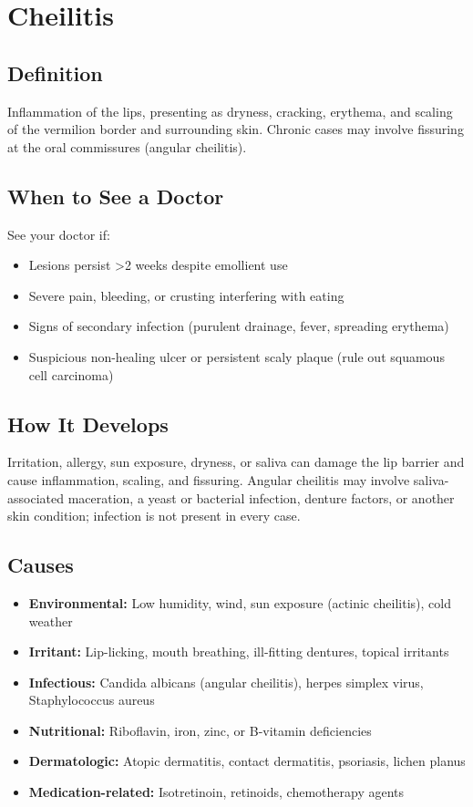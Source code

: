 \chapter{Cheilitis}

\section*{Definition}
Inflammation of the lips, presenting as dryness, cracking, erythema, and scaling of the vermilion border and surrounding skin. Chronic cases may involve fissuring at the oral commissures (angular cheilitis).

\section*{When to See a Doctor}
See your doctor if:
\begin{itemize}
  \item Lesions persist >2 weeks despite emollient use
  \item Severe pain, bleeding, or crusting interfering with eating
  \item Signs of secondary infection (purulent drainage, fever, spreading erythema)
  \item Suspicious non-healing ulcer or persistent scaly plaque (rule out squamous cell carcinoma)
\end{itemize}

\section*{How It Develops}
Irritation, allergy, sun exposure, dryness, or saliva can damage the lip barrier and cause inflammation, scaling, and fissuring. Angular cheilitis may involve saliva-associated maceration, a yeast or bacterial infection, denture factors, or another skin condition; infection is not present in every case.

\section*{Causes}
\begin{itemize}
  \item \textbf{Environmental:} Low humidity, wind, sun exposure (actinic cheilitis), cold weather
  \item \textbf{Irritant:} Lip-licking, mouth breathing, ill-fitting dentures, topical irritants
  \item \textbf{Infectious:} Candida albicans (angular cheilitis), herpes simplex virus, Staphylococcus aureus
  \item \textbf{Nutritional:} Riboflavin, iron, zinc, or B-vitamin deficiencies
  \item \textbf{Dermatologic:} Atopic dermatitis, contact dermatitis, psoriasis, lichen planus
  \item \textbf{Medication-related:} Isotretinoin, retinoids, chemotherapy agents
\end{itemize}

